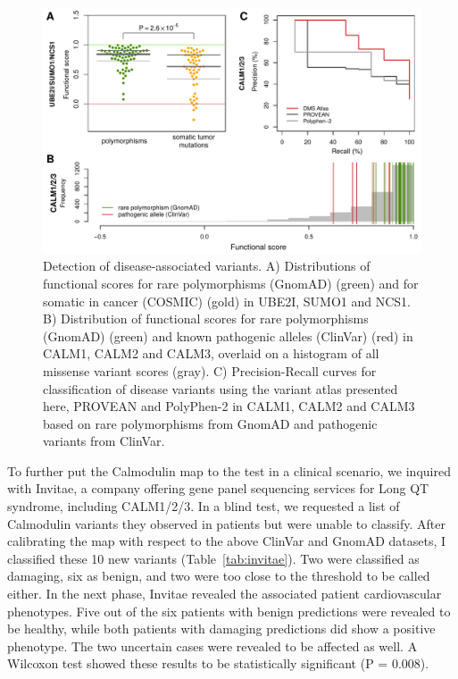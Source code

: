 \begin{figure}[h!]
	\centering
	\includegraphics[width=\textwidth]{img/calm_disease.pdf}
	\caption{Detection of disease-associated variants. A) Distributions of functional scores for rare polymorphisms (GnomAD) (green) and for somatic in cancer (COSMIC) (gold) in UBE2I, SUMO1 and NCS1. B) Distribution of functional scores for rare polymorphisms (GnomAD) (green) and known pathogenic alleles (ClinVar) (red) in CALM1, CALM2 and CALM3, overlaid on a histogram of all missense variant scores (gray). C) Precision-Recall curves for classification of disease variants using the variant atlas presented here, PROVEAN and PolyPhen-2 in CALM1, CALM2 and CALM3 based on rare polymorphisms from GnomAD and pathogenic variants from ClinVar.}
	\label{fig:calm_disease}
\end{figure}


To further put the Calmodulin map to the test in a clinical scenario, we inquired with Invitae, a company offering gene panel sequencing services for Long QT syndrome, including CALM1/2/3. In a blind test, we requested a list of Calmodulin variants they observed in patients but were unable to classify. After calibrating the map with respect to the above ClinVar and GnomAD datasets, I classified these 10 new variants (Table~\ref{tab:invitae}). Two were classified as damaging, six as benign, and two were too close to the threshold to be called either. In the next phase, Invitae revealed the associated patient cardiovascular phenotypes. Five out of the six patients with benign predictions were revealed to be healthy, while both patients with damaging predictions did show a positive phenotype. The two uncertain cases were revealed to be affected as well. A Wilcoxon test showed these results to be statistically significant (P = 0.008).

